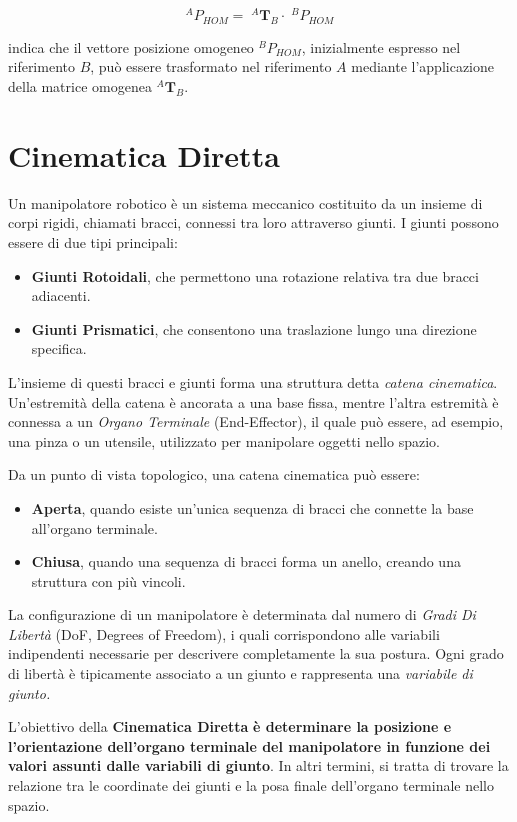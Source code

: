 ﻿\documentclass[11pt, a4paper]{article}
\begin{document}
\[
    ^{A}P_{HOM} = \; ^{A}\mathbf{T}_{B} \cdot \; ^{B}P_{HOM}
\]

indica che il vettore posizione omogeneo \( ^{B}P_{HOM} \), inizialmente espresso nel riferimento \( B \), può essere trasformato nel riferimento \( A \) mediante l'applicazione della matrice omogenea \( ^{A}\mathbf{T}_{B} \).
\newpage
\section{Cinematica Diretta}
Un manipolatore robotico è un sistema meccanico costituito da un insieme di corpi rigidi, chiamati bracci, connessi tra loro attraverso giunti. I giunti possono essere di due tipi principali:
\begin{itemize}
    \item \textbf{Giunti Rotoidali}, che permettono una rotazione relativa tra due bracci adiacenti.
    \item \textbf{Giunti Prismatici}, che consentono una traslazione lungo una direzione specifica.
\end{itemize}
L'insieme di questi bracci e giunti forma una struttura detta \emph{catena cinematica}. Un'estremità della catena è ancorata a una base fissa, mentre l'altra estremità è connessa a un \emph{Organo Terminale} (End-Effector), il quale può essere, ad esempio, una pinza o un utensile, utilizzato per manipolare oggetti nello spazio.

Da un punto di vista topologico, una catena cinematica può essere:
\begin{itemize}
    \item \textbf{Aperta}, quando esiste un'unica sequenza di bracci che connette la base all'organo terminale.
    \item \textbf{Chiusa}, quando una sequenza di bracci forma un anello, creando una struttura con più vincoli.
\end{itemize}

La configurazione di un manipolatore è determinata dal numero di \emph{Gradi Di Libertà} (DoF, Degrees of Freedom), i quali corrispondono alle variabili indipendenti necessarie per descrivere completamente la sua postura. Ogni grado di libertà è tipicamente associato a un giunto e rappresenta una \textit{variabile di giunto.}

L'obiettivo della \textbf{Cinematica Diretta} \textbf{è determinare la posizione e l'orientazione dell'organo terminale del manipolatore in funzione dei valori assunti dalle variabili di giunto}. In altri termini, si tratta di trovare la relazione tra le coordinate dei giunti e la posa finale dell'organo terminale nello spazio.
\end{document}

